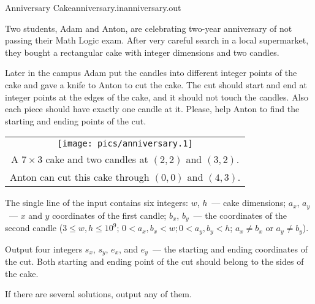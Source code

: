 \begin{problem}{Anniversary Cake}{anniversary.in}{anniversary.out}{\timeLimit}


Two students, Adam and Anton, are celebrating two-year anniversary of not passing
their Math Logic exam. After very careful search in a local supermarket,
they bought a rectangular cake with integer dimensions and two candles.

Later in the campus Adam put the candles into different integer points of the cake
and gave a knife to Anton to cut the cake.
The cut should start and end at integer points at the edges of the cake, and
it should not touch the candles. 
Also each piece should have exactly one candle at it.
Please, help Anton to find the starting and ending points of the cut.

\begin{center}
\begin{tabular}[c]{c}
  \texttt{[image: pics/anniversary.1]} \\
  A $7 \times 3$ cake and two candles at $(2, 2)$ and $(3, 2)$. \\
  Anton can cut this cake through $(0, 0)$ and $(4, 3)$.
\end{tabular}
\end{center}

\InputFile

The single line of the input contains six integers: 
    $w$, $h$~--- cake dimensions;
    $a_x$, $a_y$~--- $x$ and $y$ coordinates of the first candle;
    $b_x$, $b_y$~--- the coordinates of the second candle
($3 \le w, h \le 10^9$; $0 < a_x, b_x < w; 0 < a_y, b_y < h$; $a_x \ne b_x$ or $a_y \ne b_y$).

\OutputFile

Output four integers $s_x$, $s_y$, $e_x$, and $e_y$~---
the starting and ending coordinates of the cut.
Both starting and ending point of the cut should belong to the sides of the cake.

If there are several solutions, output any of them.

\Example

\begin{example}
%
\end{example}

\end{problem}

